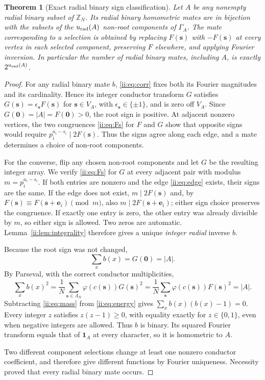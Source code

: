 \documentclass[11pt]{article}
\numberwithin{equation}{section}
\newtheorem{theorem}{Theorem}[section]
\theoremstyle{definition}
\theoremstyle{remark}
\newcommand{\s}{\boldsymbol{s}}
\newcommand{\e}{\boldsymbol{e}}
\newcommand{\one}{\mathbf 1}
\begin{document}
\begin{theorem}[Exact radial binary sign classification]\label{ii:thm:radial}
Let $A$ be any nonempty radial binary subset of $\mathbb Z_N$.  Its radial binary homometric mates are in bijection with the subsets of the $u_{\rm rad}(A)$ non-root components of $\Gamma_A$.  The mate corresponding to a selection is obtained by replacing $F(\s)$ with $-F(\s)$ at every vertex in each selected component, preserving $F$ elsewhere, and applying Fourier inversion.  In particular the number of radial binary mates, including $A$, is exactly $2^{u_{\rm rad}(A)}$.
\end{theorem}
\begin{proof}
For any radial binary mate $b$, \eqref{ii:eq:corr} fixes both its Fourier magnitudes and its cardinality.  Hence its integer conductor transform $G$ satisfies $G(\s)=\epsilon_{\s}F(\s)$ for $\s\in V_A$, with $\epsilon_{\s}\in\{\pm1\}$, and is zero off $V_A$.  Since $G(\boldsymbol0)=|A|=F(\boldsymbol0)>0$, the root sign is positive.  At adjacent nonzero vertices, the two congruences \eqref{ii:eq:Fs} for $F$ and $G$ show that opposite signs would require $p_i^{a_i-s_i}\mid2F(\s)$.  Thus the signs agree along each edge, and a mate determines a choice of non-root components.

For the converse, flip any chosen non-root components and let $G$ be the resulting integer array.  We verify \eqref{ii:eq:Fs} for $G$ at every adjacent pair with modulus $m=p_i^{a_i-s_i}$.  If both entries are nonzero and the edge \eqref{ii:eq:edge} exists, their signs are the same.  If the edge does not exist, $m\mid2F(\s)$ and, by $F(\s)\equiv F(\s+\e_i)\pmod m$, also $m\mid2F(\s+\e_i)$; either sign choice preserves the congruence.  If exactly one entry is zero, the other entry was already divisible by $m$, so either sign is allowed.  Two zeros are automatic.  Lemma~\ref{ii:lem:integrality} therefore gives a unique \emph{integer radial} inverse $b$.

Because the root sign was not changed,
\begin{equation}\label{ii:eq:mass}
 \sum_x b(x)=G(\boldsymbol0)=|A|.
\end{equation}
By Parseval, with the correct conductor multiplicities,
\begin{equation}\label{ii:eq:energy}
 \sum_x b(x)^2=\frac1N\sum_{\s\in\Lambda_N}
 \varphi(c(\s))G(\s)^2
 =\frac1N\sum_{\s}\varphi(c(\s))F(\s)^2=|A|.
\end{equation}
Subtracting \eqref{ii:eq:mass} from \eqref{ii:eq:energy} gives $\sum_x b(x)(b(x)-1)=0$.  Every integer $z$ satisfies $z(z-1)\ge0$, with equality exactly for $z\in\{0,1\}$, even when negative integers are allowed.  Thus $b$ is binary.  Its squared Fourier transform equals that of $\one_A$ at every character, so it is homometric to $A$.

Two different component selections change at least one nonzero conductor coefficient, and therefore give different functions by Fourier uniqueness.  Necessity proved that every radial binary mate occurs.\qedhere
\end{proof}
\end{document}
